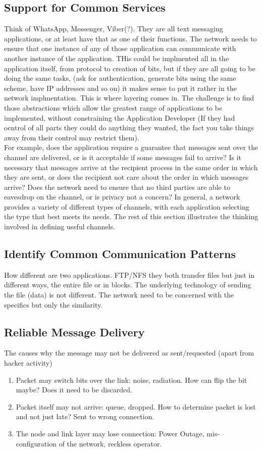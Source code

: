 \documentclass[12pt]{book}
\begin{document}
\subsection{Support for Common Services}
Think of WhatsApp, Messenger, Viber(?). They are all text messaging applications, or at least have that as one of their functions. The network needs to ensure that one instance of any of those application can communicate with another instance of the application. THis could be implmented all in the application itself, from protocol to creation of bits, but if they are all going to be doing the same tasks, (ask for authentication, generate bits using the same scheme, have IP addresses and so on) it makes sense to put it rather in the network implmentation. This is where layering comes in. The challenge is to find those abstractions which allow the greatest range of applications to be implemented, without constraining the Application Developer (If they had ocntrol of all parts they could do anything they wanted, the fact you take things away from their control may restrict them).\\
For example, does the application require a guarantee that messages sent over the channel are delivered, or is it acceptable if some messages fail to arrive? Is it necessary that messages arrive at the recipient process in the same order in which they are sent, or does the recipient not care about the order in which messages arrive? Does the network need to ensure that no third parties are able to eavesdrop on the channel, or is privacy not a concern? In general, a network provides a variety of different types of channels, with each application selecting the type that best meets its needs. The rest of this section illustrates the thinking involved in defining useful channels.

\subsection{Identify Common Communication Patterns}
How different are two applications. FTP/NFS they both transfer files but just in different ways, the entire file or in blocks. The underlying technology of sending the file (data) is not different. The network need to be concerned with the specifics but only the similarity.

\subsection{Reliable Message Delivery}
The causes why the message may not be delivered as sent/requested (apart from hacker activity)
\begin{enumerate}
    \item Packet may switch bits over the link: noise, radiation. How can flip the bit maybe? Does it need to be discarded.
    \item Packet itself may not arrive: queue, dropped. How to determine packet is lost and not just late? Sent to wrong connection.
    \item The node and link layer may lose connection: Power Outage, mis-configuration of the network, reckless operator.
\end{enumerate}
\end{document}
